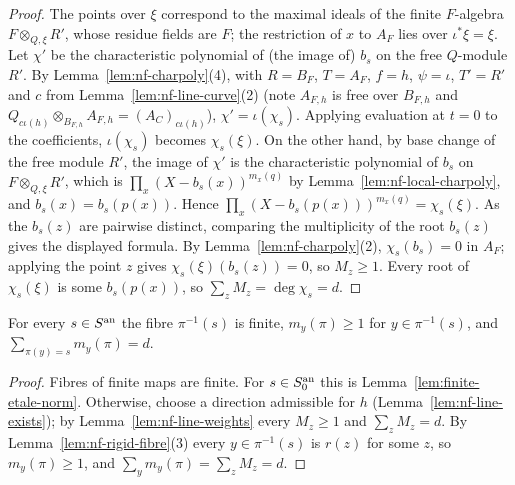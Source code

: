 \begin{proof}
The points over $\xi$ correspond to the maximal ideals of the finite $F$-algebra $F\otimes_{Q,\xi}R'$, whose residue
fields are $F$; the restriction of $x$ to $A_F$ lies over $\iota^*\xi=\xi$. Let $\chi'$ be the characteristic
polynomial of (the image of) $b_s$ on the free $Q$-module $R'$. By Lemma~\ref{lem:nf-charpoly}(4), with $R=B_F$,
$T=A_F$, $f=h$, $\psi=\iota$, $T'=R'$ and $c$ from Lemma~\ref{lem:nf-line-curve}(2) (note $A_{F,h}$ is free over
$B_{F,h}$ and $Q_{c\iota(h)}\otimes_{B_{F,h}}A_{F,h}=(A_C)_{c\iota(h)}$), $\chi'=\iota(\chi_s)$. Applying evaluation at
$t=0$ to the coefficients, $\iota(\chi_s)$ becomes $\chi_s(\xi)$. On the other hand, by base change of the free module
$R'$, the image of $\chi'$ is the characteristic polynomial of $b_s$ on $F\otimes_{Q,\xi}R'$, which is
$\prod_x(X-b_s(x))^{m_x(q)}$ by Lemma~\ref{lem:nf-local-charpoly}, and $b_s(x)=b_s(p(x))$. Hence
$\prod_x(X-b_s(p(x)))^{m_x(q)}=\chi_s(\xi)$. As the $b_s(z)$ are pairwise distinct, comparing the multiplicity of the
root $b_s(z)$ gives the displayed formula. By Lemma~\ref{lem:nf-charpoly}(2), $\chi_s(b_s)=0$ in $A_F$; applying the
point $z$ gives $\chi_s(\xi)(b_s(z))=0$, so $M_z\ge1$. Every root of $\chi_s(\xi)$ is some $b_s(p(x))$, so
$\sum_zM_z=\deg\chi_s=d$.
\end{proof}

\begin{lemma}\label{lem:nf-weights-basic}
\leanok
{}
For every $s\in S^{\mathrm{an}}$ the fibre $\pi^{-1}(s)$ is finite, $m_y(\pi)\ge1$ for $y\in\pi^{-1}(s)$, and
$\sum_{\pi(y)=s}m_y(\pi)=d$.
\end{lemma}

\begin{proof}
Fibres of finite maps are finite. For $s\in S_0^{\mathrm{an}}$ this is Lemma~\ref{lem:finite-etale-norm}. Otherwise, choose a
direction admissible for $h$ (Lemma~\ref{lem:nf-line-exists}); by Lemma~\ref{lem:nf-line-weights} every $M_z\ge1$ and
$\sum_zM_z=d$. By Lemma~\ref{lem:nf-rigid-fibre}(3) every $y\in\pi^{-1}(s)$ is $r(z)$ for some $z$, so $m_y(\pi)\ge1$,
and $\sum_ym_y(\pi)=\sum_zM_z=d$.
\end{proof}

